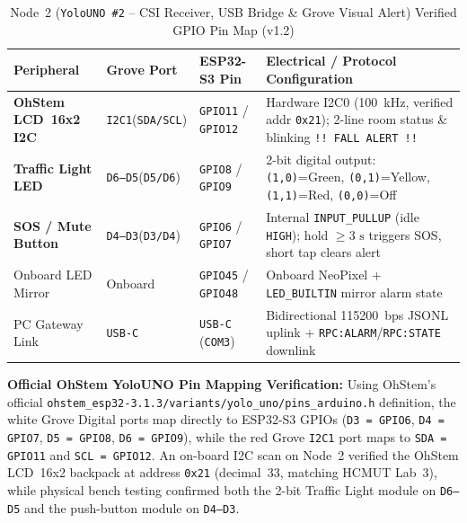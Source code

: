 \documentclass{hcmut-report}
\begin{document}
\begin{table}[H]
\centering
\caption{Node~2 (\texttt{YoloUNO \#2} -- CSI Receiver, USB Bridge \& Grove Visual Alert) Verified GPIO Pin Map (v1.2)}
\label{tab:pin_node2}
\footnotesize
\begin{tabularx}{\textwidth}{|P{3.1cm}|C{2.4cm}|C{2.7cm}|Y|}
\hline
\textbf{Peripheral} & \textbf{Grove Port} & \textbf{ESP32-S3 Pin} & \textbf{Electrical / Protocol Configuration} \\
\hline
\textbf{OhStem LCD~16x2 I2C} & \texttt{I2C1}\newline(\texttt{SDA/SCL}) & \texttt{GPIO11} / \texttt{GPIO12} & Hardware I2C0 (100~kHz, verified addr \texttt{0x21}); 2-line room status \& blinking \texttt{!! FALL ALERT !!} \\
\hline
\textbf{Traffic Light LED} & \texttt{D6--D5}\newline(\texttt{D5/D6}) & \texttt{GPIO8} / \texttt{GPIO9} & 2-bit digital output: \texttt{(1,0)}=Green, \texttt{(0,1)}=Yellow, \texttt{(1,1)}=Red, \texttt{(0,0)}=Off \\
\hline
\textbf{SOS / Mute Button} & \texttt{D4--D3}\newline(\texttt{D3/D4}) & \texttt{GPIO6} / \texttt{GPIO7} & Internal \texttt{INPUT\_PULLUP} (idle \texttt{HIGH}); hold $\geq 3\text{ s}$ triggers SOS, short tap clears alert \\
\hline
Onboard LED Mirror & Onboard & \texttt{GPIO45} / \texttt{GPIO48} & Onboard NeoPixel + \texttt{LED\_BUILTIN} mirror alarm state \\
\hline
PC Gateway Link & \texttt{USB-C} & \texttt{USB-C} (\texttt{COM3}) & Bidirectional 115200~bps JSONL uplink + \texttt{RPC:ALARM}/\texttt{RPC:STATE} downlink \\
\hline
\end{tabularx}
\end{table}

\noindent\textbf{Official OhStem YoloUNO Pin Mapping Verification:} Using OhStem's official \texttt{ohstem\_esp32-3.1.3/variants/yolo\_uno/pins\_arduino.h} definition, the white Grove Digital ports map directly to ESP32-S3 GPIOs (\texttt{D3 = GPIO6}, \texttt{D4 = GPIO7}, \texttt{D5 = GPIO8}, \texttt{D6 = GPIO9}), while the red Grove \texttt{I2C1} port maps to \texttt{SDA = GPIO11} and \texttt{SCL = GPIO12}. An on-board I2C scan on Node~2 verified the OhStem LCD~16x2 backpack at address \texttt{0x21} (decimal~33, matching HCMUT Lab~3), while physical bench testing confirmed both the 2-bit Traffic Light module on \texttt{D6--D5} and the push-button module on \texttt{D4--D3}.
\end{document}
